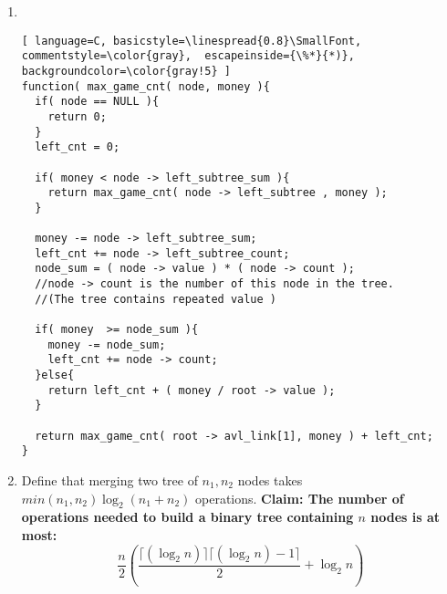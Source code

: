 \documentclass[fleqn,a4paper,12pt]{article}
\begin{document}
\begin{enumerate}
\begin{lstlisting}[ basicstyle=\linespread{0.8}\SmallFont, language=C++, backgroundcolor=\color{gray!5}]
    tediour_game = GetInput();
    interesting_game = GetInput();

    tedious_game_set_root = set_find_root_ind( tediour_game );
    interesting_game_set_root = set_find_root_ind( interesting_game );

    tedious_game_set = disjoint_sets[tedious_game_set_root];
    interesting_game_set = disjoint_sets[interesting_game_set_root]

    disjoint_set::merge( tedious_game_set, interesting_game_set );
    setOwner[interesting_game_set_root] = setOwner[tedious_game_set_root];

  }else{

    friend_game = GetInput();

    friend_game_set_root = disjoint_set::find_root_ind( friend_game );

    Print( setOwner[friend_game_set_root] );

  }
}
      \end{lstlisting}

\item\ \\
  \begin{lstlisting}[ language=C, basicstyle=\linespread{0.8}\SmallFont, commentstyle=\color{gray},  escapeinside={\%*}{*)}, backgroundcolor=\color{gray!5} ]
function( max_game_cnt( node, money ){
  if( node == NULL ){
    return 0;
  }
  left_cnt = 0;

  if( money < node -> left_subtree_sum ){ 
    return max_game_cnt( node -> left_subtree , money ); 
  }

  money -= node -> left_subtree_sum;
  left_cnt += node -> left_subtree_count;	
  node_sum = ( node -> value ) * ( node -> count );
  //node -> count is the number of this node in the tree.
  //(The tree contains repeated value )  

  if( money  >= node_sum ){
    money -= node_sum;
    left_cnt += node -> count;
  }else{
    return left_cnt + ( money / root -> value );
  }

  return max_game_cnt( root -> avl_link[1], money ) + left_cnt;
}

  \end{lstlisting}  

\item
  Define that merging two tree of $n_1,n_2$ nodes takes $min(n_1,n_2)\log_2(n_1+n_2)$ operations.
  \textbf{Claim: The number of operations needed to build a binary tree containing $n$ nodes is at most: }
  \[\frac{n}{2} ( \frac{ \lceil (\log_2 n) \rceil \lceil (\log_2 n) - 1 \rceil }{2} + \log_2 n )\]
  

\end{enumerate}
\end{document}
